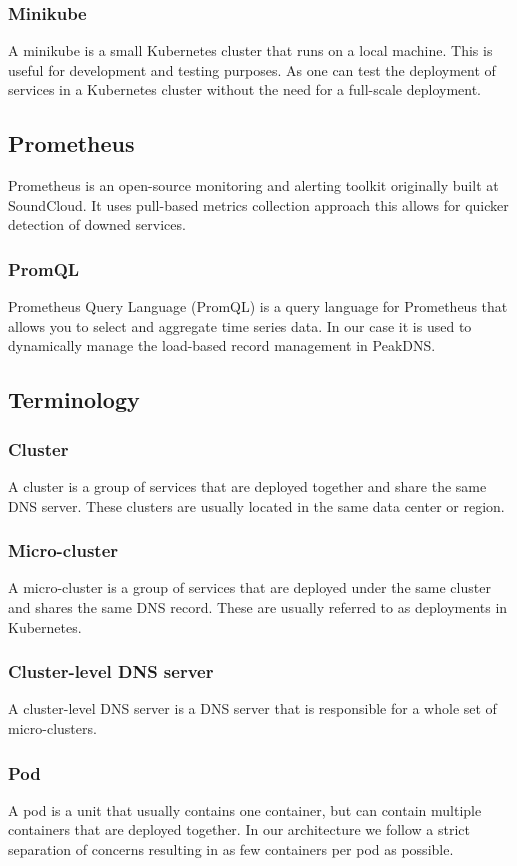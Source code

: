 \documentclass[12pt]{article}
\begin{document}
\subsubsection{Minikube}
A minikube is a small Kubernetes cluster that runs on a local machine. This is useful for development and testing purposes.
As one can test the deployment of services in a Kubernetes cluster without the need for a full-scale deployment.

\subsection{Prometheus}
Prometheus is an open-source monitoring and alerting toolkit originally built at SoundCloud.
It uses pull-based metrics collection approach this allows for quicker detection of downed services.

\subsubsection{PromQL}
Prometheus Query Language (PromQL) is a query language for Prometheus that allows you to select and aggregate time series data.
In our case it is used to dynamically manage the load-based record management in PeakDNS.

\subsection{Terminology}
\subsubsection{Cluster}
    A cluster is a group of services that are deployed together and share the same DNS server.
    These clusters are usually located in the same data center or region.
\subsubsection{Micro-cluster}
    A micro-cluster is a group of services that are deployed under the same cluster and shares the same DNS record.
    These are usually referred to as deployments in Kubernetes.
\subsubsection{Cluster-level DNS server}
    A cluster-level DNS server is a DNS server that is responsible for a whole set of micro-clusters.
\subsubsection{Pod}
    A pod is a unit that usually contains one container, but can contain multiple containers that are deployed together.
    In our architecture we follow a strict separation of concerns resulting in as few containers per pod as possible.
\end{document}
